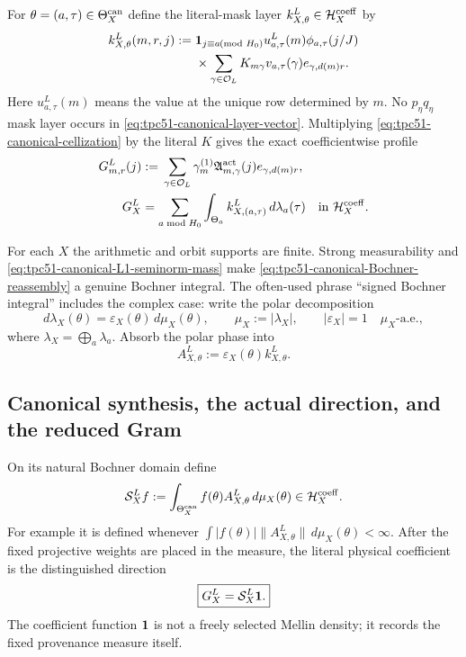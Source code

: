 For $\theta=(a,\tau)\in\Theta_X^{\rm can}$ define the literal-mask layer
$k_{X,\theta}^{L}\in\mathcal H_X^{\rm coeff}$ by
\begin{align}
 k_{X,\theta}^{L}(m,r,j)
 :={}&\mathbf 1_{j\equiv a\!\!\!\pmod{H_0}}
 u_{a,\tau}^{L}(m)\phi_{a,\tau}(j/J)
 \notag\\
 &\times
 \sum_{\gamma\in\mathcal O_L}
 K_{m\gamma}v_{a,\tau}(\gamma)
 e_{\gamma,d(m)r}.
 \label{eq:tpc51-canonical-layer-vector}
\end{align}
Here $u_{a,\tau}^{L}(m)$ means the value at the unique row determined by
$m$.  No $p_\eta q_\eta$ mask layer occurs in
\eqref{eq:tpc51-canonical-layer-vector}.  Multiplying
\eqref{eq:tpc51-canonical-cellization} by the literal $K$ gives the exact
coefficientwise profile
\begin{align}
 G_{m,r}^{L}(j)
 &:={}
 \sum_{\gamma\in\mathcal O_L}
 \gamma_m^{(1)}\mathfrak A_{m,\gamma}^{\rm act}(j)
 e_{\gamma,d(m)r},
 \label{eq:tpc51-physical-vector-profile}\\
 G_X^{L}
 &=\sum_{a\bmod H_0}\int_{\Theta_a}
 k_{X,(a,\tau)}^{L}\,d\lambda_a(\tau)
 \quad\text{in }\mathcal H_X^{\rm coeff}.
 \label{eq:tpc51-canonical-Bochner-reassembly}
\end{align}

For each $X$ the arithmetic and orbit supports are finite.  Strong
measurability and \eqref{eq:tpc51-canonical-L1-seminorm-mass} make
\eqref{eq:tpc51-canonical-Bochner-reassembly} a genuine Bochner integral.
The often-used phrase ``signed Bochner integral'' includes the complex case:
write the polar decomposition
\begin{equation}
 d\lambda_X(\theta)
 =\varepsilon_X(\theta)\,d\mu_X(\theta),
 \qquad
 \mu_X:=|\lambda_X|,
 \qquad
 |\varepsilon_X|=1\quad\mu_X\text{-a.e.},
 \label{eq:tpc51-polar-measure}
\end{equation}
where $\lambda_X=\bigoplus_a\lambda_a$.  Absorb the polar phase into
\begin{equation}
 A_{X,\theta}^{L}:=\varepsilon_X(\theta)k_{X,\theta}^{L}.
 \label{eq:tpc51-polar-layer}
\end{equation}

\subsection{Canonical synthesis, the actual direction, and the reduced Gram}

On its natural Bochner domain define
\begin{equation}
 \mathcal S_X^{L}f
 :=\int_{\Theta_X^{\rm can}}
 f(\theta)A_{X,\theta}^{L}\,d\mu_X(\theta)
 \in\mathcal H_X^{\rm coeff}.
 \label{eq:tpc51-canonical-synthesis}
\end{equation}
For example it is defined whenever
$\int |f(\theta)|\|A_{X,\theta}^{L}\|\,d\mu_X(\theta)<\infty$.
After the fixed projective weights are placed in the measure, the literal
physical coefficient is the distinguished direction
\begin{equation}
 \boxed{G_X^{L}=\mathcal S_X^{L}\mathbf 1.}
 \label{eq:tpc51-actual-direction}
\end{equation}
The coefficient function $\mathbf 1$ is not a freely selected Mellin density; it
records the fixed provenance measure itself.

